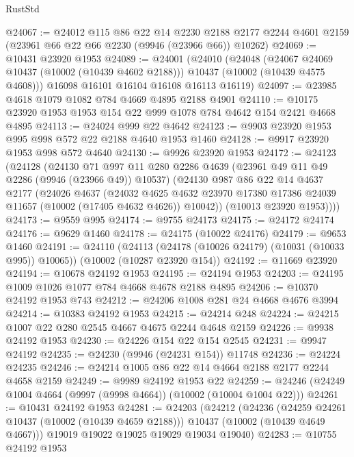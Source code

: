 \begin{lexlean}{RustStd}
\begin{coremodule}
@24067 := @24012
    @115
    @86
    @22
    @14
    @2230
    @2188
    @2177
    @2244
    @4601
    @2159
    (@23961 @66 @22 @66 @2230 (@9946 (@23966 @66)) @10262)
@24069 := @10431 @23920 @1953
@24089 := @24001
    (@24010
      (@24048
        (@24067 @24069 @10437 (@10002 (@10439 @4602 @2188)))
        @10437
        (@10002 (@10439 @4575 @4608)))
      @16098
      @16101
      @16104
      @16108
      @16113
      @16119)
@24097 := @23985 @4618 @1079 @1082 @784 @4669 @4895 @2188 @4901
@24110 := @10175 @23920 @1953 @1953 @154 @22 @999 @1078 @784 @4642 @154 @2421 @4668 @4895
@24113 := @24024 @999 @22 @4642
@24123 := @9903 @23920 @1953 @995 @998 @572 @22 @2188 @4640 @1953 @1460
@24128 := @9917 @23920 @1953 @998 @572 @4640
@24130 := @9926 @23920 @1953
@24172 := @24123
    (@24128
      (@24130
        @71
        @997
        @11
        @280
        @2286
        @4639
        (@23961 @49 @11 @49 @2286 (@9946 (@23966 @49)) @10537)
        (@24130
          @987
          @86
          @22
          @14
          @4637
          @2177
          (@24026
            @4637
            (@24032
              @4625
              @4632
              @23970
              @17380
              @17386
              @24039
              @11657
              (@10002 (@17405 @4632 @4626))
              @10042))
          (@10013 @23920 @1953))))
@24173 := @9559 @995
@24174 := @9755 @24173
@24175 := @24172 @24174
@24176 := @9629 @1460
@24178 := @24175 (@10022 @24176)
@24179 := @9653 @1460
@24191 := @24110
    (@24113 (@24178 (@10026 @24179) (@10031 (@10033 @995)) @10065))
    (@10002 (@10287 @23920 @154))
@24192 := @11669 @23920
@24194 := @10678 @24192 @1953
@24195 := @24194 @1953
@24203 := @24195 @1009 @1026 @1077 @784 @4668 @4678 @2188 @4895
@24206 := @10370 @24192 @1953 @743
@24212 := @24206 @1008 @281 @24 @4668 @4676 @3994
@24214 := @10383 @24192 @1953
@24215 := @24214 @248
@24224 := @24215 @1007 @22 @280 @2545 @4667 @4675 @2244 @4648 @2159
@24226 := @9938 @24192 @1953
@24230 := @24226 @154 @22 @154 @2545
@24231 := @9947 @24192
@24235 := @24230 (@9946 (@24231 @154)) @11748
@24236 := @24224 @24235
@24246 := @24214 @1005 @86 @22 @14 @4664 @2188 @2177 @2244 @4658 @2159
@24249 := @9989 @24192 @1953 @22
@24259 := @24246 (@24249 @1004 @4664 (@9997 (@9998 @4664)) (@10002 (@10004 @1004 @22)))
@24261 := @10431 @24192 @1953
@24281 := @24203
    (@24212
      (@24236
        (@24259 @24261 @10437 (@10002 (@10439 @4659 @2188)))
        @10437
        (@10002 (@10439 @4649 @4667)))
      @19019
      @19022
      @19025
      @19029
      @19034
      @19040)
@24283 := @10755 @24192 @1953

\end{coremodule}
\end{lexlean}
